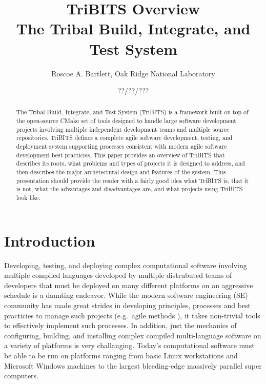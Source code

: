 \documentclass[10pt]{article}
\title{
TriBITS Overview \\[1.5ex]
\large The Tribal Build, Integrate, and Test System
}
\author{Roscoe A. Bartlett, Oak Ridge National Laboratory}
\date{??/??/???}
\begin{document}
\maketitle

\begin{abstract}

The Tribal Build, Integrate, and Test System (TriBITS) is a framework built on top of the open-source CMake set of tools designed to handle large software development projects involving multiple independent development teams and multiple source repositories.  TriBITS defines a complete agile software development, testing, and deployment system supporting processes consistent with modern agile software development best practicies.  This paper provides an overview of TriBITS that describes its roots, what problems and types of projects it is designed to address, and then describes the major archetectural design and features of the system.  This presentation should provide the reader with a fairly good idea what TriBITS is, that it is not, what the advantages and disadvantages are, and what projects using TriBITS look like.

\end{abstract}

\tableofcontents

%
\section{Introduction}
%

Developing, testing, and deploying complex computational software involving multiple compiled languages developed by multiple distrubuted teams of developers that must be deployed on many different platforms on an aggressive schedule is a daunting endeavor.  While the modern software engineering (SE) community has made great strides in developing principles, processes and best practicies to manage such projects (e.g.\ agile methods \cite{CodeComplete2nd04, AgileSoftwareDevelopment, ContinuousIntegration07, XP2, TDD}), it takes non-trivial tools to effectively implement such processes.  In addition, just the mechanics of configuring, building, and installing complex compiled multi-language software on a variety of platforms is very challanging.  Today's computational software must be able to be run on platforms ranging from basic Linux workstations and Microsoft Windows machines to the largest bleeding-edge massively parallel super computers.
\end{document}
